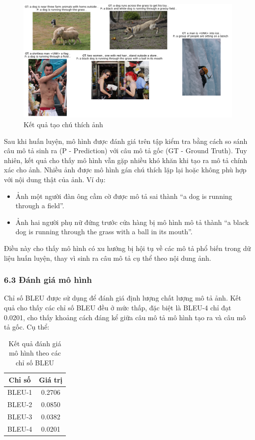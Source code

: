 \documentclass[../main.tex]{subfiles}
\begin{document}
\begin{figure}[H]
    \centering
    \includegraphics[width=1\textwidth]{Image/result2.png}
    \caption{Kết quả tạo chú thích ảnh}
    \label{fig:loss}
\end{figure}

Sau khi huấn luyện, mô hình được đánh giá trên tập kiểm tra bằng cách so sánh câu mô tả sinh ra (P - Prediction) với câu mô tả gốc (GT - Ground Truth). Tuy nhiên, kết quả cho thấy mô hình vẫn gặp nhiều khó khăn khi tạo ra mô tả chính xác cho ảnh. Nhiều ảnh được mô hình gán chú thích lặp lại hoặc không phù hợp với nội dung thật của ảnh. Ví dụ:
\begin{itemize}
    \item Ảnh một người đàn ông cầm cờ được mô tả sai thành “a dog is running through a field”.
    \item Ảnh hai người phụ nữ đứng trước cửa hàng bị mô hình mô tả thành “a black dog is running through the grass with a ball in its mouth”.
\end{itemize}

Điều này cho thấy mô hình có xu hướng bị hội tụ về các mô tả phổ biến trong dữ liệu huấn luyện, thay vì sinh ra câu mô tả cụ thể theo nội dung ảnh.

\subsubsection*{6.3 Đánh giá mô hình}

Chỉ số BLEU được sử dụng để đánh giá định lượng chất lượng mô tả ảnh. Kết quả cho thấy các chỉ số BLEU đều ở mức thấp, đặc biệt là BLEU-4 chỉ đạt 0.0201, cho thấy khoảng cách đáng kể giữa câu mô tả mô hình tạo ra và câu mô tả gốc. Cụ thể:
\begin{table}[H]
\centering
\begin{tabular}{|c|c|}
\hline
\textbf{Chỉ số} & \textbf{Giá trị} \\
\hline
BLEU-1 & 0.2706 \\
BLEU-2 & 0.0850 \\
BLEU-3 & 0.0382 \\
BLEU-4 & 0.0201 \\
\hline
\end{tabular}
\caption{Kết quả đánh giá mô hình theo các chỉ số BLEU}
\label{tab:bleu_scores}
\end{table}
\end{document}

